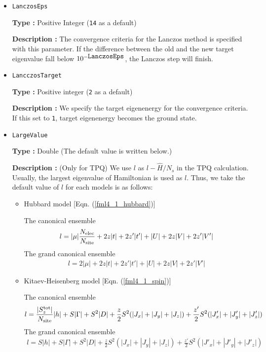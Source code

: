 \begin{itemize}
{\bf Description :}  We specify the number of getting eigenvectors from the ground energy by Lanczos method.\\
When exct=2, we obtain the eigenvector of the first-excited state.

{\bf Note}:  the following condition must be satisfied: \verb|nvec| $>=$ \verb|exct|.

\item \verb|LanczosEps|

{\bf Type :} Positive Integer (\verb|14| as a default)

{\bf Description :} The convergence criteria for the Lanczos method is specified with this parameter.
If the difference between the old and the new target eigenvalue fall below $10^{- \verb|LanczosEps|}$, 
the Lanczos step will finish.

\item \verb|LancczosTarget|

{\bf Type :} Positive integer (\verb|2| as a default)

{\bf Description :} We specify the target eigenenergy for the convergence criteria.
If this set to \verb|1|, target eigenenergy becomes the ground state.

\item \verb|LargeValue|

{\bf Type :} Double (The default value is written below.)

{\bf Description :} (Only for TPQ) 
We use $l$ as $l-\hat{H}/N_{s}$ in the TPQ calculation.
Usually, the largest eigenvalue of Hamiltonian is used as $l$. 
Thus, we take the default value of $l$ for each models is as follows:

\begin{itemize}

\item Hubbard model [Eqn. (\ref{fml4_1_hubbard})]

The canonical ensemble
\begin{align}
l = |\mu| \frac{N_{\rm elec}}{N_{\rm site}}
+ 2 z |t| + 2 z' |t'| + |U| + 2 z |V| + 2 z' |V'| 
\end{align}
The grand canonical ensemble
\begin{align}
l = 2|\mu|
+ 2 z |t| + 2 z' |t'| + |U| + 2 z |V| + 2 z' |V'|
\end{align}

\item Kitaev-Heisenberg model [Eqn. (\ref{fml4_1_spin})]

The canonical ensemble
\begin{align}
l = \frac{|S_z^{\rm tot}|}{N_{\rm site}}|h| + S |\Gamma| + S^2 |D|
+\frac{z}{2} S^2 (|J_x|+|J_y|+|J_z|) +\frac{z'}{2} S^2 (|J'_x|+|J'_y|+|J'_z|)
\end{align}
The grand canonical ensemble
\begin{align}
l = S |h| + S |\Gamma| + S^2 |D|
+\frac{z}{2} S^2 (|J_x|+|J_y|+|J_z|) + \frac{z'}{2} S^2 (|J'_x|+|J'_y|+|J'_z|) 
\end{align}


\end{itemize}
\end{itemize}
